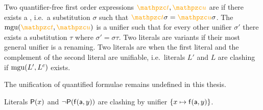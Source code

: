
\begin{definition}\label{def:unifier}
Two quantifier-free first order expressions \( \foxt, \foxu \) are  if there exists a ,
i.e.~a substitution \( \sigma \) such that \( \foxt\sigma=\foxu\sigma \).
The  \( \mgu(\foxt,\foxu) \) is a unifier such that
for every other unifier \( \sigma' \) there exists a substitution \( \tau \) where
\( \sigma' = \sigma \tau \).
Two literals are variants if their most general unifier is a renaming.
Two literals are  when the first literal
and the complement of the second literal are unifiable,
i.e.~literals \( L' \) and \( L \) are clashing if \( \operatorname{mgu}(L', L^c) \) exists.
\end{definition}

\begin{remark}
	The unification of quantified formulae remains undefined in this thesis.
\end{remark}

\begin{example}
	Literals \( \mathsf{P}(x) \) and \( \lnot\mathsf{P}(\mathsf{f}(\mathsf{a},y)) \)
	are clashing by unifier \( \{ x\mapsto \mathsf{f}(\mathsf{a},y)\} \).
\end{example}
